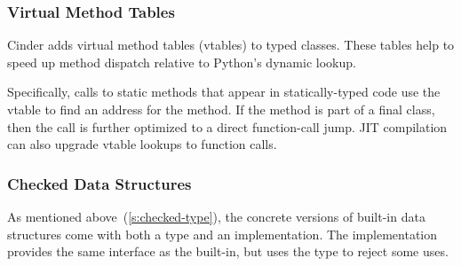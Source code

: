 \documentclass[english,cleveref,submission]{programming}
\begin{document}
\subsubsection{Virtual Method Tables}
\label{s:vtable}

Cinder adds virtual method tables (vtables) to typed classes.
These tables help to speed up method dispatch relative to Python's
dynamic lookup.

Specifically, calls to static methods that appear in statically-typed
code use the vtable to find an address for the method.
If the method is part of a final class, then the call is further optimized
to a direct function-call jump.
JIT compilation can also upgrade vtable lookups to function calls.



\subsubsection{Checked Data Structures}
\label{s:chkdict-impl}

As mentioned above~(\cref{s:checked-type}), the concrete versions of built-in data structures
come with both a type and an implementation.
The implementation provides the same interface as the built-in,
but uses the type to reject some uses.
\end{document}
